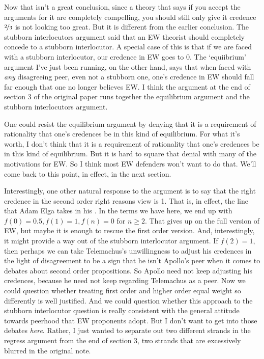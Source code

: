 Now that isn't a great conclusion, since a theory that says if you accept the arguments for it are completely compelling, you should still only give it credence $\nicefrac{2}{3}$ is not looking too great. But it is different from the earlier conclusion. The stubborn interlocutors argument said that an EW theorist should completely concede to a stubborn interlocutor. A special case of this is that if we are faced with a stubborn interlocutor, our credence in EW goes to 0. The `equiibrium' argument I've just been running, on the other hand, says that when faced with \textit{any} disagreeing peer, even not a stubborn one, one's credence in EW should fall far enough that one no longer believes EW. I think the argument at the end of section 3 of the original paper runs together the equilibrium argument and the stubborn interlocutors argument.

One could resist the equilibrium argument by denying that it is a requirement of rationality that one's credences be in this kind of equilibrium. For what it's worth, I don't think that it is a requirement of rationality that one's credences be in this kind of equilibrium. But it is hard to square that denial with many of the motivations for EW. So I think most EW defenders won't want to do that. We'll come back to this point, in effect, in the next section.

Interestingly, one other natural response to the argument is to say that the right credence in the second order right reasons view is 1. That is, in effect, the line that Adam Elga takes in his \citeyearpar{Elga2010-ELGHTD}. In the terms we have here, we end up with $f(0) = 0.5, f(1) = 1, f(n) = 0$ for $n \geq 2$. That gives up on the full version of EW, but maybe it is enough to rescue the first order version. And, interestingly, it might provide a way out of the stubborn interlocutor argument. If $f(2) = 1$, then perhaps we can take Telemachus's unwillingness to adjust his credences in the light of disagreement to be a sign that he isn't Apollo's peer when it comes to debates about second order propositions. So Apollo need not keep adjusting his credences, because he need not keep regarding Telemachus as a peer. Now we could question whether treating first order and higher order equal weight so differently is well justified.  And we could question whether this approach to the stubborn interlocutor question is really consistent with the general attitude towards peerhood that EW proponents adopt. But I don't want to get into those debates \textit{here}. Rather, I just wanted to separate out two different strands in the regress argument from the end of section 3, two strands that are excessively blurred in the original note.

